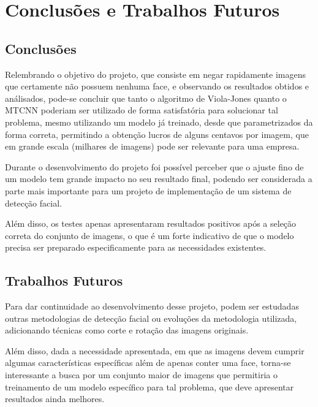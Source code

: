 \chapter{Conclusões e Trabalhos Futuros}\label{cap:conclusao}

\section{Conclusões}

Relembrando o objetivo do projeto, que consiste em negar rapidamente imagens que certamente não possuem nenhuma face, e observando os resultados obtidos e análisados, pode-se concluir que tanto o algoritmo de Viola-Jones quanto o MTCNN poderiam ser utilizado de forma satisfatória para solucionar tal problema, mesmo utilizando um modelo já treinado, desde que parametrizados da forma correta, permitindo a obtenção lucros de alguns centavos por imagem, que em grande escala (milhares de imagens) pode ser relevante para uma empresa.

Durante o desenvolvimento do projeto foi possível perceber que o ajuste fino de um modelo tem grande impacto no seu resultado final, podendo ser considerada a parte mais importante para um projeto de implementação de um sistema de detecção facial.

Além disso, os testes apenas apresentaram resultados positivos após a seleção correta do conjunto de imagens, o que é um forte indicativo de que o modelo precisa ser preparado especificamente para as necessidades existentes.

\section{Trabalhos Futuros}

Para dar continuidade ao desenvolvimento desse projeto, podem ser estudadas outras metodologias de detecção facial ou evoluções da metodologia utilizada, adicionando técnicas como corte e rotação das imagens originais.

Além disso, dada a necessidade apresentada, em que as imagens devem cumprir algumas características específicas além de apenas conter uma face, torna-se interessante a busca por um conjunto maior de imagens que permitiria o treinamento de um modelo específico para tal problema, que deve apresentar resultados ainda melhores.
